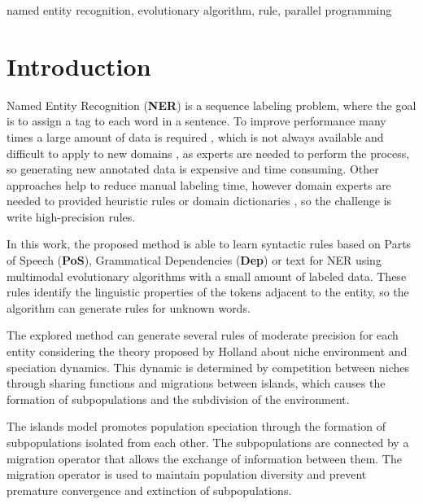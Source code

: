 \documentclass{IEEEtran}
\begin{document}
\begin{keywords}
  named entity recognition, evolutionary algorithm, rule, parallel programming

\end{keywords}


\section{Introduction}


Named Entity Recognition (\textbf{NER}) is a sequence labeling problem, where the goal is to assign a tag to each word in a sentence. To improve performance many times a large amount of data is required \cite{ma-etal-2022-label}, which is not always available and difficult to apply to new domains \cite{Huang2020FewShotNE}, as experts are needed to perform the process, so generating new annotated data is expensive and time consuming\cite{Shang2018}. Other approaches help to reduce manual labeling time, however domain experts are needed to provided heuristic rules \cite{Fries2017} or domain dictionaries\cite{Shang2018,Safranchik2020,Lison2020} , so the challenge is write high-precision rules.

In this work, the proposed method is able to learn syntactic rules based on Parts of Speech (\textbf{PoS}), Grammatical Dependencies (\textbf{Dep}) or text for NER using multimodal evolutionary algorithms with a small amount of labeled data. These rules identify the linguistic properties of the tokens adjacent to the entity, so the algorithm can generate rules for unknown words.

The explored method can generate several rules of moderate precision for each entity considering the theory proposed by Holland \cite{holland-1992-adaptation} about niche environment and speciation dynamics. This dynamic is determined by competition between niches through sharing functions and migrations between islands, which causes the formation of subpopulations and the subdivision of the environment.

The islands model promotes population speciation through the formation of subpopulations isolated from each other. The subpopulations are connected by a migration operator that allows the exchange of information between them\cite{holland-1992-adaptation}. The migration operator is used to maintain population diversity and prevent premature convergence and extinction of subpopulations.
\end{document}
